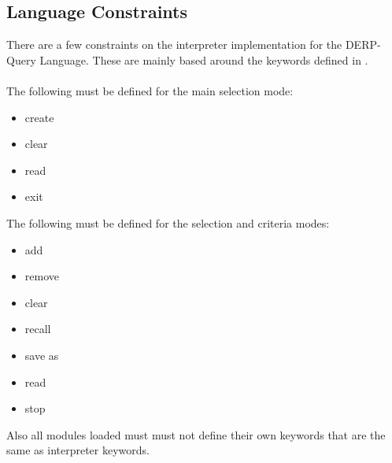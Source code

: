 \subsection{Language Constraints}
There are a few constraints on the interpreter implementation for the DERP-Query Language. These are mainly based around the keywords defined in .\\
\\The following must be defined for the main selection mode:

\begin{itemize}
    \item create 
    \item clear
    \item read
    \item exit 
\end{itemize}

\noindent The following must be defined for the selection and criteria modes:

\begin{itemize}
    \item add
    \item remove
    \item clear
    \item recall
    \item save as
    \item read
    \item stop
\end{itemize}

\noindent Also all modules loaded must must not define their own keywords that are the same as interpreter keywords.
